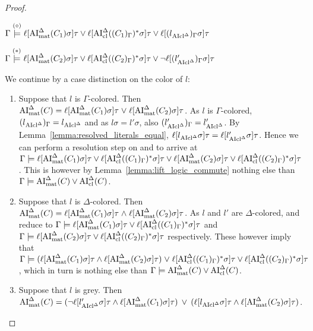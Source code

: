 \documentclass[,%
	draft=false,%
	numbers=noendperiod
	11pt,
	a4paper,
	oneside,%
	openany,
]{memoir}
\begin{document}
\begin{proof}
\begin{description}
			$\Gamma \stackrel{(\circ)}{\models} \ell[\operatorname{AI}_\mathrm{mat}^\Delta(C_1)\sigma]\tau \lor \ell[\operatorname{AI}_\mathrm{cl}^\Delta((C_1)_\Gamma)^*\sigma]\tau \lor \ell[(l{_{\operatorname{AIcl}^\Delta}})_\Gamma\sigma]\tau$

			$\Gamma \stackrel{(*)}{\models} \ell[\operatorname{AI}_\mathrm{mat}^\Delta(C_2)\sigma]\tau \lor \ell[\operatorname{AI}_\mathrm{cl}^\Delta((C_2)_\Gamma)^*\sigma]\tau \lor \lnot \ell[(l{_{\operatorname{AIcl}^\Delta}'})_\Gamma\sigma]\tau$

			We continue by a case distinction on the color of $l$:
			\begin{enumerate}
				\item Suppose that $l$ is $\Gamma$-colored. Then $\operatorname{AI}_\mathrm{mat}^\Delta(C) = \ell[\operatorname{AI}_\mathrm{mat}^\Delta(C_1)\sigma]\tau\;{\lor}\; \ell[\operatorname{AI}_\mathrm{mat}^\Delta(C_2)\sigma]\tau$.
					As $l$ is $\Gamma$-colored, $(l{_{\operatorname{AIcl}^\Delta}})_\Gamma = l_{\operatorname{AIcl}^\Delta}$ and
					as $l\sigma = l'\sigma$, also $(l{_{\operatorname{AIcl}^\Delta}'})_\Gamma = l'_{\operatorname{AIcl}^\Delta}$.
					By Lemma~\ref{lemma:resolved_literals_equal}, $\ell[l{_{\operatorname{AIcl}^\Delta}}\sigma]\tau = \ell[l{_{\operatorname{AIcl}^\Delta}'}\sigma]\tau$.
					Hence we can perform a resolution step on \markA{} and \markB{} to arrive at
					$\Gamma \models \ell[\operatorname{AI}_\mathrm{mat}^\Delta(C_1)\sigma]\tau \lor \ell[\operatorname{AI}_\mathrm{cl}^\Delta((C_1)_\Gamma)^*\sigma]\tau
					\lor \ell[\operatorname{AI}_\mathrm{mat}^\Delta(C_2)\sigma]\tau \lor \ell[\operatorname{AI}_\mathrm{cl}^\Delta((C_2)_\Gamma)^*\sigma]\tau$.
					This is however by Lemma~\ref{lemma:lift_logic_commute} nothing else than $\Gamma \models \operatorname{AI}_\mathrm{mat}^\Delta(C) \lor \operatorname{AI}_\mathrm{cl}^\Delta(C)$.

				\item Suppose that $l$ is $\Delta$-colored. Then $\operatorname{AI}_\mathrm{mat}^\Delta(C) = \ell[\operatorname{AI}_\mathrm{mat}^\Delta(C_1)\sigma]\tau\;{\land}\; \ell[\operatorname{AI}_\mathrm{mat}^\Delta(C_2)\sigma]\tau$.
					As $l$ and $l'$ are $\Delta$-colored, \markA{} and \markB{} reduce to
					$\Gamma \models \ell[\operatorname{AI}_\mathrm{mat}^\Delta(C_1)\sigma]\tau \lor \ell[\operatorname{AI}_\mathrm{cl}^\Delta((C_1)_\Gamma)^*\sigma]\tau $ and
					$\Gamma \models \ell[\operatorname{AI}_\mathrm{mat}^\Delta(C_2)\sigma]\tau \lor \ell[\operatorname{AI}_\mathrm{cl}^\Delta((C_2)_\Gamma)^*\sigma]\tau $ respectively.
					These however imply that
					$\Gamma \models (\ell[\operatorname{AI}_\mathrm{mat}^\Delta(C_1)\sigma]\tau \land  \ell[\operatorname{AI}_\mathrm{mat}^\Delta(C_2)\sigma]\tau) \;{\lor}\;\allowbreak \ell[\operatorname{AI}_\mathrm{cl}^\Delta((C_1)_\Gamma)^*\sigma]\tau \lor \ell[\operatorname{AI}_\mathrm{cl}^\Delta((C_2)_\Gamma)^*\sigma]\tau$,
					which in turn is nothing else than $\Gamma \entails\nolinebreak \AImatde(C) \lor \AIclde(C)$.

				\item Suppose that $l$ is grey. Then $\operatorname{AI}_\mathrm{mat}^\Delta(C) =
					(\lnot {\ell[l'\ensuremath{_{\operatorname{AIcl}^\Delta}}\sigma]}\tau \land \ell[\operatorname{AI}_\mathrm{mat}^\Delta(C_1)\sigma]\tau) \;\,{\lor}\;\,\allowbreak
					(\ell[l_{\operatorname{AIcl}^\Delta}\sigma]\tau \land \ell[\operatorname{AI}_\mathrm{mat}^\Delta(C_2)\sigma]\tau)
					$.


\end{enumerate}
\end{description}
\end{proof}
\end{document}
